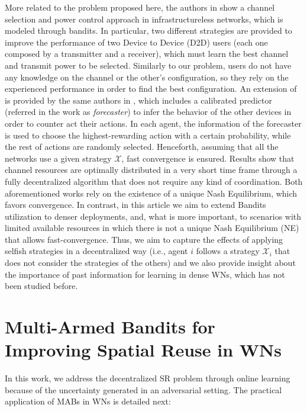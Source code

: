 \documentclass[preprint,12pt]{elsarticle}
\begin{document}
	More related to the problem proposed here, the authors in \cite{maghsudi2015joint} show a channel selection and power control approach in infrastructureless networks, which is modeled through bandits. In particular, two different strategies are provided to improve the performance of two Device to Device (D2D) users (each one composed by a transmitter and a receiver), which must learn the best channel and transmit power to be selected. Similarly to our problem, users do not have any knowledge on the channel or the other's configuration, so they rely on the experienced performance in order to find the best configuration. An extension of \cite{maghsudi2015joint} is provided by the same authors in \cite{maghsudi2015channel}, which includes a calibrated predictor (referred in the work as \textit{forecaster}) to infer the behavior of the other devices in order to counter act their actions. In each agent, the information of the forecaster is used to choose the highest-rewarding action with a certain probability, while the rest of actions are randomly selected. Henceforth, assuming that all the networks use a given strategy $\mathcal{X}$, fast convergence is ensured. Results show that channel resources are optimally distributed in a very short time frame through a fully decentralized algorithm that does not require any kind of coordination. Both aforementioned works rely on the existence of a unique Nash Equilibrium, which favors convergence. In contrast, in this article we aim to extend Bandits utilization to denser deployments, and, what is more important, to scenarios with limited available resources in which there is not a unique Nash Equilibrium (NE) that allows fast-convergence. Thus, we aim to capture the effects of applying selfish strategies in a decentralized way (i.e., agent $i$ follows a strategy $\mathcal{X}_i$ that does not consider the strategies of the others) and we also provide insight about the importance of past information for learning in dense WNs, which has not been studied before.
	
	\section{Multi-Armed Bandits for Improving Spatial Reuse in WNs}
	\label{section:mabs}
	
	In this work, we address the decentralized SR problem through online learning because of the uncertainty generated in an adversarial setting. The practical application of MABs in WNs is detailed next:
	
\end{document}
